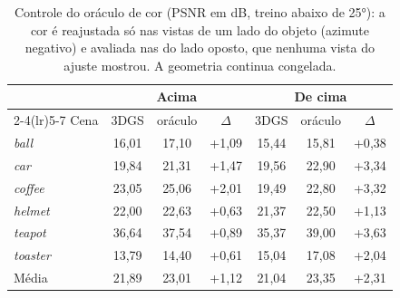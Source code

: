 \begin{table}[t]
\centering
\caption{Controle do oráculo de cor (PSNR em dB, treino abaixo de 25°): a cor é reajustada só nas vistas de um lado do objeto (azimute negativo) e avaliada nas do lado oposto, que nenhuma vista do ajuste mostrou. A geometria continua congelada.}
\label{tab:oposto25}
\setlength{\tabcolsep}{4pt}
\begin{tabular}{l ccc ccc}
\toprule
 & \multicolumn{3}{c}{Acima} & \multicolumn{3}{c}{De cima} \\
\cmidrule(lr){2-4}\cmidrule(lr){5-7}
Cena & 3DGS & oráculo & $\Delta$ & 3DGS & oráculo & $\Delta$ \\
\midrule
\textit{ball} & 16{,}01 & 17{,}10 & +1{,}09 & 15{,}44 & 15{,}81 & +0{,}38 \\
\textit{car} & 19{,}84 & 21{,}31 & +1{,}47 & 19{,}56 & 22{,}90 & +3{,}34 \\
\textit{coffee} & 23{,}05 & 25{,}06 & +2{,}01 & 19{,}49 & 22{,}80 & +3{,}32 \\
\textit{helmet} & 22{,}00 & 22{,}63 & +0{,}63 & 21{,}37 & 22{,}50 & +1{,}13 \\
\textit{teapot} & 36{,}64 & 37{,}54 & +0{,}89 & 35{,}37 & 39{,}00 & +3{,}63 \\
\textit{toaster} & 13{,}79 & 14{,}40 & +0{,}61 & 15{,}04 & 17{,}08 & +2{,}04 \\
\midrule
Média & 21{,}89 & 23{,}01 & +1{,}12 & 21{,}04 & 23{,}35 & +2{,}31 \\
\bottomrule
\end{tabular}
\end{table}
